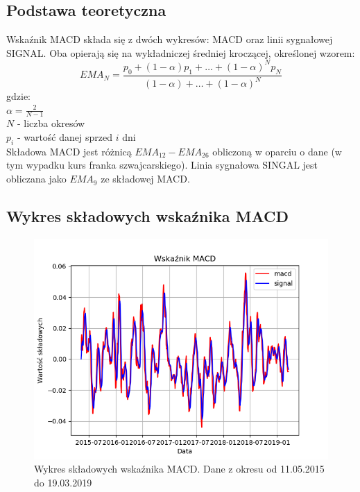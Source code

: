 \documentclass{article} %
\begin{document}
\subsection{Podstawa teoretyczna}
Wskaźnik MACD składa się z dwóch wykresów: MACD oraz linii sygnałowej SIGNAL. 
Oba opierają się na wykładniczej średniej kroczącej, określonej wzorem: \\
\begin{equation}
    EMA_{N} = \frac{p_{0} + (1-\alpha)p_{1} + \dots + (1-\alpha)^N p_{N}}{(1-\alpha) + \dots + (1-\alpha)^N}
\end{equation}
gdzie: \\ \newline
$ \alpha = \frac{2}{N - 1} $ \\
$ N $ - liczba okresów \\
$ p_{i} $ - wartość danej sprzed $ i $ dni \\


Składowa MACD jest różnicą $ EMA_{12} - EMA_{26} $ obliczoną w oparciu o dane (w tym wypadku kurs franka szwajcarskiego). 
Linia sygnałowa SINGAL jest obliczana jako $ EMA_{9} $ ze składowej MACD.

\subsection{Wykres składowych wskaźnika MACD}

\begin{figure}[h]
    \centering
    \includegraphics[scale=0.7]{images/wykres_macd.png}
    \caption{Wykres składowych wskaźnika MACD. Dane z okresu od 11.05.2015 do 19.03.2019}
\end{figure}
\end{document}
